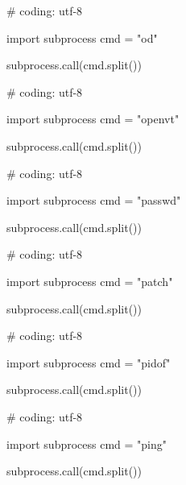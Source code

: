 \begin{mylisting}[label={lst:acpid},language=sh,caption=od]

# coding: utf-8

import subprocess
cmd = "od"

subprocess.call(cmd.split())

\end{mylisting}

\begin{mylisting}[label={lst:acpid},language=sh,caption=openvt]

# coding: utf-8

import subprocess
cmd = "openvt"

subprocess.call(cmd.split())

\end{mylisting}

\begin{mylisting}[label={lst:acpid},language=sh,caption=passwd]

# coding: utf-8

import subprocess
cmd = "passwd"

subprocess.call(cmd.split())

\end{mylisting}

\begin{mylisting}[label={lst:acpid},language=sh,caption=patch]

# coding: utf-8

import subprocess
cmd = "patch"

subprocess.call(cmd.split())

\end{mylisting}

\begin{mylisting}[label={lst:acpid},language=sh,caption=pidof]

# coding: utf-8

import subprocess
cmd = "pidof"

subprocess.call(cmd.split())

\end{mylisting}

\begin{mylisting}[label={lst:acpid},language=sh,caption=ping]

# coding: utf-8

import subprocess
cmd = "ping"

subprocess.call(cmd.split())

\end{mylisting}

